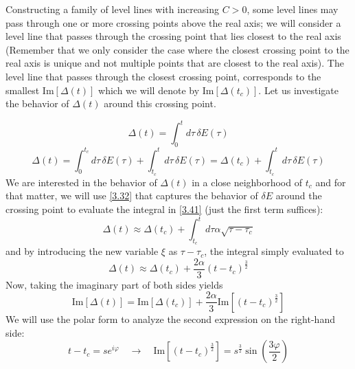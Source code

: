 \documentclass[12pt,a4paper]{article}
\begin{document}
 	Constructing a family of level lines with increasing $C>0$, some level lines may pass through one or more crossing points above the real axis; we will consider a level line that passes through the crossing point that lies closest to the real axis (Remember that we only consider the case where the closest crossing point to the real axis is unique and not multiple points that are closest to the real axis). The level line that passes through the closest crossing point, corresponds to the smallest $\mathrm{Im} [\Delta(t)]$ which we will denote by $\mathrm{Im} [\Delta(t_{c})]$. Let us investigate the behavior of $\Delta (t)$ around this crossing point.
 	
 	\begin{equation}
 		\Delta (t) = \int_{0}^{t} d\tau \, \delta E(\tau)
 	\end{equation}
 	\begin{equation}
 		\Delta (t) = \int_{0}^{t_{c}} d\tau \, \delta E(\tau) + \int_{t_{c}}^{t} d\tau \, \delta E(\tau) = \Delta(t_{c}) + \int_{t_{c}}^{t} d\tau \, \delta E(\tau) \label{3.41}
 	\end{equation}
 	We are interested in the behavior of $\Delta(t)$ in a close neighborhood of $t_{c}$ and for that matter, we will use \eqref{3.32} that captures the behavior of $\delta E$ around the crossing point to evaluate the integral in \eqref{3.41} (just the first term suffices):
 	\begin{equation}
 		\Delta (t) \approx \Delta (t_{c}) + \int_{t_{c}}^{t} d\tau \alpha \sqrt{\tau - \tau_{c}} \label{3.42}
 	\end{equation}
 	and by introducing the new variable $\xi$ as $\tau - \tau_{c}$, the integral simply evaluated to
 	\begin{equation}
 		\Delta (t) \approx \Delta (t_{c}) + \dfrac{2\alpha}{3} \left(t - t_{c}\right)^{\frac{3}{2}}
 	\end{equation}
 	Now, taking the imaginary part of both sides yields
 	\begin{equation}
 		\mathrm{Im} [\Delta (t)] = \mathrm{Im} [\Delta (t_{c})] + \dfrac{2\alpha}{3} \mathrm{Im} [\left(t - t_{c}\right)^{\frac{3}{2}}] \label{3.44}
 	\end{equation}
 	We will use the polar form to analyze the second expression on the right-hand side:
 	\begin{equation}
 		t - t_{c} = s e^{i\varphi} \quad \rightarrow \quad \mathrm{Im} [\left( t - t_{c} \right)^{\frac{3}{2}}] = s^{\frac{3}{2}} \sin(\frac{3 \varphi}{2}) \label{3.45}
 	\end{equation}
\end{document}
